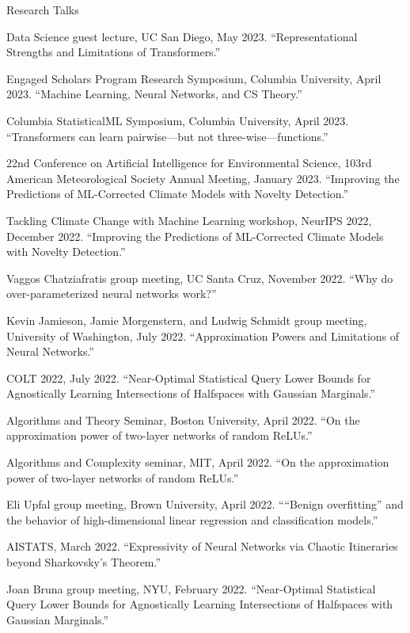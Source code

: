 \documentclass{resume} %
\begin{document}
\begin{rSection}{Research Talks}
\begin{rSubsection}{}{}{}

\item Data Science guest lecture, UC San Diego, May 2023. ``Representational Strengths and Limitations of Transformers.''
\item Engaged Scholars Program Research Symposium, Columbia University, April 2023. ``Machine Learning, Neural Networks, and CS Theory.''
\item Columbia StatisticalML Symposium, Columbia University, April 2023. ``Transformers can learn pairwise---but not three-wise---functions.''
\item 22nd Conference on Artificial Intelligence for Environmental Science, 103rd American Meteorological Society Annual Meeting, January 2023. ``Improving the Predictions of ML-Corrected Climate Models with Novelty Detection.''
\item Tackling Climate Change with Machine Learning workshop, NeurIPS 2022, December 2022. ``Improving the Predictions of ML-Corrected Climate Models with Novelty Detection.''
\item Vaggos Chatziafratis group meeting, UC Santa Cruz, November 2022. ``Why do over-parameterized neural networks work?''
\item Kevin Jamieson, Jamie Morgenstern, and Ludwig Schmidt group meeting, University of Washington, July 2022. ``Approximation Powers and Limitations of Neural Networks.''
\item COLT 2022, July 2022.  ``Near-Optimal Statistical Query Lower Bounds for Agnostically Learning Intersections of Halfspaces with Gaussian Marginals.''
\item Algorithms and Theory Seminar, Boston University, April 2022. ``On the approximation power of two-layer networks of random ReLUs.'' 
\item Algorithms and Complexity seminar, MIT, April 2022. ``On the approximation power of two-layer networks of random ReLUs.'' 
\item Eli Upfal group meeting, Brown University, April 2022. ``“Benign overfitting” and the behavior of high-dimensional linear regression and classification models.''
\item AISTATS, March 2022. ``Expressivity of Neural Networks via Chaotic Itineraries beyond Sharkovsky's Theorem.'' 
\item  Joan Bruna group meeting, NYU, February 2022. ``Near-Optimal Statistical Query Lower Bounds for Agnostically Learning Intersections of Halfspaces with Gaussian Marginals.''

\end{rSubsection}
\end{rSection}
\end{document}
